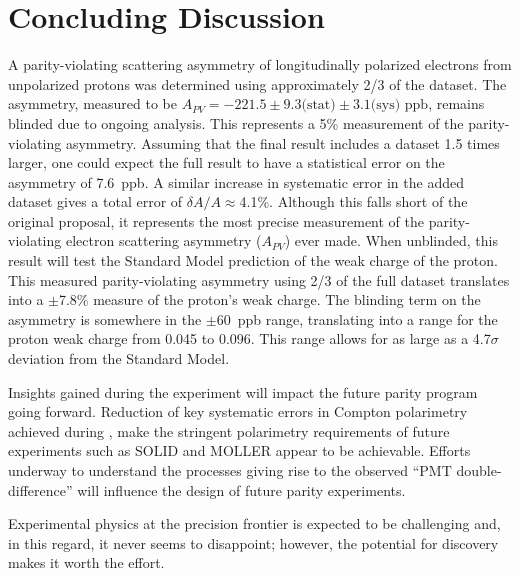 
\chapter{Concluding Discussion} %
\captionsetup{justification=raggedright,singlelinecheck=false}

\label{Conclusion}  


A parity-violating scattering asymmetry of longitudinally polarized electrons from unpolarized protons was determined using approximately 2/3 of the \Qs dataset. The asymmetry, measured to be  $A_{PV}=-221.5\pm9.3\text{(stat)}\pm3.1\text{(sys)~ppb}$, remains blinded due to ongoing analysis. This represents a 5\% measurement of the parity-violating asymmetry. Assuming that the final result includes a dataset 1.5 times larger, one could expect the full result to have a statistical error on the asymmetry of 7.6~ppb. A similar increase in systematic error in the added dataset gives a total error of $\delta A/A\approx$4.1\%. Although this falls short of the original proposal, it represents the most precise measurement of the parity-violating electron scattering asymmetry ($A_{PV}$) ever made. When unblinded, this result will test the Standard Model prediction of the weak charge of the proton. This measured parity-violating asymmetry using 2/3 of the full dataset translates into a $\pm$7.8\% measure of the proton's weak charge. The blinding term on the asymmetry is somewhere in the $\pm$60~ppb range, translating into a range for the proton weak charge from 0.045 to 0.096. This range allows for as large as a 4.7$\sigma$ deviation from the Standard Model.

Insights gained during the \Qs experiment will impact the future parity program going forward. Reduction of key systematic errors in Compton polarimetry achieved during \Q, make the stringent polarimetry requirements of future experiments such as SOLID and MOLLER appear to be achievable. Efforts underway to understand the processes giving rise to the observed ``PMT double-difference'' will influence the design of future parity experiments. 

Experimental physics at the precision frontier is expected to be challenging and, in this regard, it never seems to disappoint; however, the potential for discovery makes it worth the effort.
